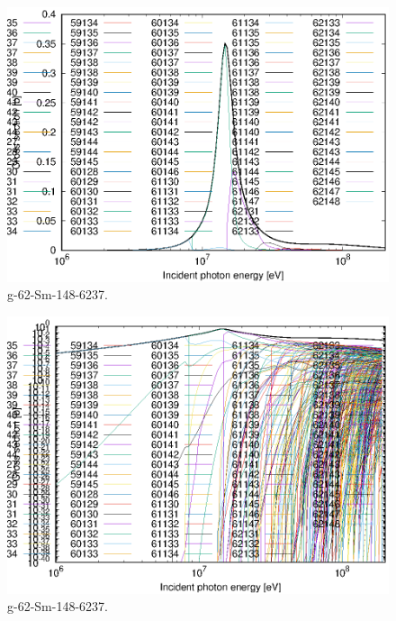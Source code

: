 \begin{figure}
 \includegraphics[width=\linewidth]{eps/g_62-Sm-148_6237.eps}
  \caption{g-62-Sm-148-6237.}
\end{figure}
\begin{figure}
 \includegraphics[width=\linewidth]{eps-log/g_62-Sm-148_6237.eps}
 \caption{g-62-Sm-148-6237.}
\end{figure}
\newpage \clearpage

